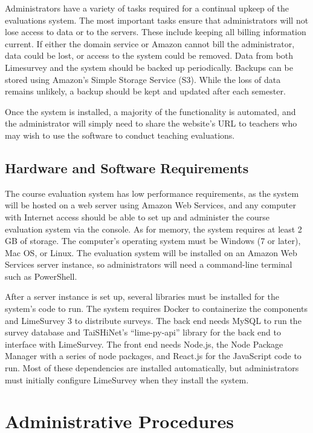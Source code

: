 \documentclass{article}
\begin{document}
Administrators have a variety of tasks required for a continual upkeep of the evaluations system. The most important tasks ensure that administrators will not lose access to data or to the servers. These include keeping all billing information current. If either the domain service or Amazon cannot bill the administrator, data could be lost, or access to the system could be removed. Data from both Limesurvey and the system should be backed up periodically. Backups can be stored using Amazon's Simple Storage Service (S3).  While the loss of data remains unlikely, a backup should be kept and updated after each semester. 

Once the system is installed, a majority of the functionality is automated, and the administrator will simply need to share the website's URL to teachers who may wish to use the software to conduct teaching evaluations.

\subsection{Hardware and Software Requirements}

The course evaluation system has low performance requirements, as the system will be hosted on a web server using Amazon Web Services, and any computer with Internet access should be able to set up and administer the course evaluation system via the console. As for memory, the system requires at least 2 GB of storage. The computer's operating system must be Windows (7 or later), Mac OS, or Linux. The evaluation system will be installed on an Amazon Web Services server instance, so administrators will need a command-line terminal such as PowerShell.

After a server instance is set up, several libraries must be installed for the system's code to run. The system requires Docker to containerize the components and LimeSurvey 3 to distribute surveys. The back end needs MySQL to run the survey database and TaiSHiNet's ``lime-py-api'' library for the back end to interface with LimeSurvey. The front end needs Node.js, the Node Package Manager with a series of node packages, and React.js for the JavaScript code to run. Most of these dependencies are installed automatically, but administrators must initially configure LimeSurvey when they install the system.

\section{Administrative Procedures}
\end{document}
